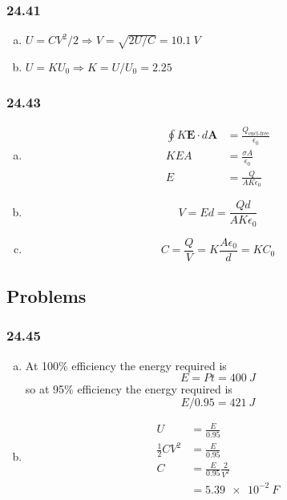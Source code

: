 \documentclass{article}
\begin{document}
\subsubsection{24.41}

\begin{enumerate}[(a)]
  \item $U = C V^2 / 2 \Rightarrow V = \sqrt{2 U / C} = \qty{10.1}{V}$

  \item $U = K U_0 \Rightarrow K = U / U_0 = 2.25$
\end{enumerate}

\subsubsection{24.43}

\begin{enumerate}[(a)]
  \item

        \begin{align*}
          \oint K \mathbf{E} \cdot d\mathbf{A} & = \frac{Q_\textrm{encl-free}}{\epsilon_0} \\
          K E A                                & = \frac{\sigma A}{\epsilon_0}             \\
          E                                    & = \frac{Q}{A K \epsilon_0}
        \end{align*}

  \item \[V = E d = \frac{Q d}{A K \epsilon_0}\]

  \item \[C = \frac{Q}{V} = K \frac{A \epsilon_0}{d} = K C_0\]
\end{enumerate}

\subsection{Problems}

\subsubsection{24.45}

\begin{enumerate}[(a)]
  \item At 100\% efficiency the energy required is \[E = P t = \qty{400}{J}\] so at 95\% efficiency the energy required is \[E / 0.95 = \qty{421}{J}\]

  \item

        \begin{align*}
          U                 & = \frac{E}{0.95}               \\
          \frac{1}{2} C V^2 & = \frac{E}{0.95}               \\
          C                 & = \frac{E}{0.95} \frac{2}{V^2} \\
                            & = \qty{5.39e-2}{F}
        \end{align*}
\end{enumerate}
\end{document}
